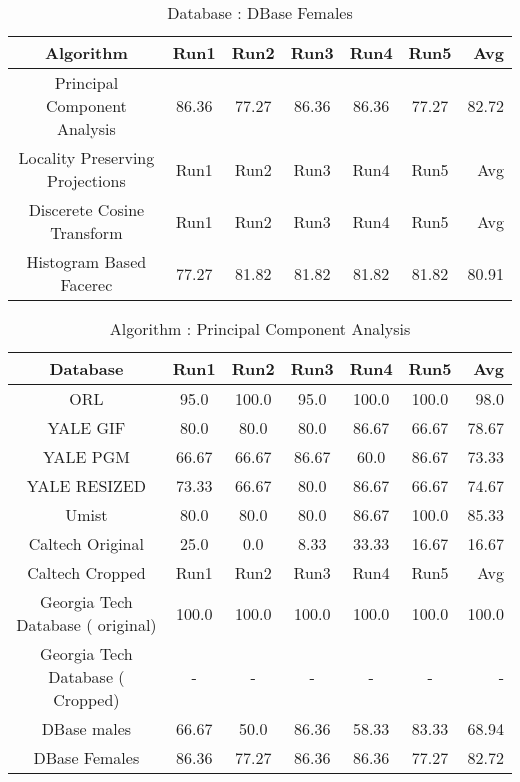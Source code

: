 \documentclass[10pt,a4paper]{article}
\begin{document}
\begin{center}
\begin{table}
\caption{Database : DBase Females }
\centering
\begin{tabular}{| c | c | c | c | c | c | r | } \hline 
Algorithm & Run1 & Run2 & Run3 & Run4 & Run5 & Avg \\  
\hline
Principal Component Analysis & 86.36 & 77.27 & 86.36 & 86.36 & 77.27 & 82.72 \\
\hline
Locality Preserving Projections & Run1 & Run2 & Run3 & Run4 & Run5 & Avg \\
\hline
Discerete Cosine Transform & Run1 & Run2 & Run3 & Run4 & Run5 & Avg \\
\hline
Histogram Based Facerec & 77.27 & 81.82 & 81.82 & 81.82 & 81.82 & 80.91 \\
\hline
\end{tabular}
\end{table}

\begin{table}
\caption{Algorithm : Principal Component Analysis }
\centering
\begin{tabular}{| c | c | c | c | c | c | r | } \hline 
Database & Run1 & Run2 & Run3 & Run4 & Run5 & Avg  \\  
\hline
ORL & 95.0 & 100.0 & 95.0 & 100.0 & 100.0 & 98.0 \\
\hline
YALE GIF & 80.0 & 80.0 & 80.0 & 86.67 & 66.67 & 78.67 \\
\hline
YALE PGM & 66.67 & 66.67 & 86.67 & 60.0 & 86.67 & 73.33 \\
\hline
YALE RESIZED & 73.33 & 66.67 & 80.0 & 86.67 & 66.67 & 74.67 \\
\hline
Umist & 80.0 & 80.0 & 80.0 & 86.67 & 100.0 & 85.33 \\
\hline
Caltech Original & 25.0 & 0.0 & 8.33 & 33.33 & 16.67 & 16.67 \\
\hline
Caltech Cropped & Run1 & Run2 & Run3 & Run4 & Run5 & Avg \\
\hline
Georgia Tech Database ( original) & 100.0 & 100.0 & 100.0 & 100.0 & 100.0 & 100.0 \\
\hline
Georgia Tech Database ( Cropped) & - & - & - & - & - & - \\
\hline
DBase males & 66.67 & 50.0 & 86.36 & 58.33 & 83.33 & 68.94 \\
\hline
DBase Females  & 86.36 & 77.27 & 86.36 & 86.36 & 77.27 & 82.72 \\
\hline
\end{tabular}
\end{table}


\end{center}
\end{document}
